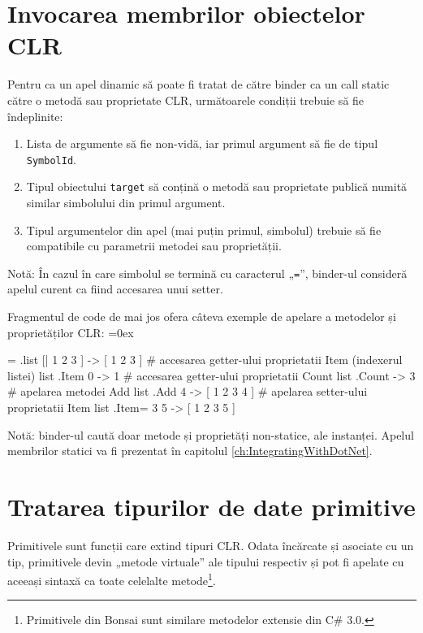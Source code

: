 \documentclass[12pt,a4paper]{memoir}
\renewcommand{\c}{\texttt}
\newenvironment{code}
{
\definecolor{shadecolor}{gray}{0.91}
\topsep=0ex
\relax
\shaded
\verbatim
}
{
\endverbatim
\endshaded
}
\begin{document}
\section{Invocarea membrilor obiectelor CLR}\label{sec:invoking_clr_members}

Pentru ca un apel dinamic să poate fi tratat de către binder ca un call static către o metodă sau proprietate CLR, următoarele condiții trebuie să fie îndeplinite:

\begin{enumerate}
\item Lista de argumente să fie non-vidă, iar primul argument să fie de tipul \c{SymbolId}.
\item Tipul obiectului \c{target} să conțină o metodă sau proprietate publică numită similar simbolului din primul argument.
\item Tipul argumentelor din apel (mai puțin primul, simbolul) trebuie să fie compatibile cu parametrii metodei sau proprietății.
\end{enumerate}

Notă: În cazul în care simbolul se termină cu caracterul „\c{=}”, binder-ul consideră apelul curent ca fiind accesarea unui setter. 

Fragmentul de code de mai jos ofera câteva exemple de apelare a metodelor și proprietăților CLR:
\begin{code}
= .list [| 1 2 3 ]
  -> [ 1 2 3 ]
# accesarea getter-ului proprietatii Item (indexerul listei)
list .Item 0
  -> 1
# accesarea getter-ului proprietatii Count
list .Count
  -> 3
# apelarea metodei Add
list .Add 4
  -> [ 1 2 3 4 ]
# apelarea setter-ului proprietatii Item
list .Item= 3 5
  -> [ 1 2 3 5 ]
\end{code}

Notă: binder-ul caută doar metode și proprietăți non-statice, ale instanței. Apelul membrilor statici va fi prezentat în capitolul \ref{ch:IntegratingWithDotNet}.

\section{Tratarea tipurilor de date primitive}\label{ch:runtime_sec:primitives}

Primitivele sunt funcții care extind tipuri CLR. Odata încărcate și asociate cu un tip, primitivele devin „metode virtuale” ale tipului respectiv și pot fi apelate cu aceeași sintaxă ca toate celelalte metode\footnote{Primitivele din Bonsai sunt similare metodelor extensie din C\# 3.0.}.
\end{document}
